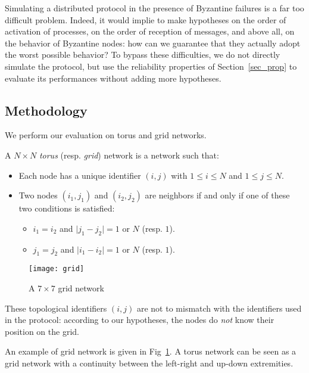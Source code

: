 \documentclass[a4paper,11pt]{article}
\begin{document}
Simulating a distributed protocol in the presence of Byzantine failures is a far too difficult problem. Indeed, it would implie to make hypotheses on the order of activation of processes, on the order of reception of messages, and above all, on the behavior of Byzantine nodes: how can we guarantee that they actually adopt the worst possible behavior? To bypass these difficulties, we do not directly simulate the protocol, but use the reliability properties of Section~\ref{sec_prop} to evaluate its performances without adding more hypotheses.

\subsection{Methodology}

We perform our evaluation on torus and grid networks.

\begin{definition}
A $N \times N$ \emph{torus} (resp. \emph{grid}) network is a network such that:
\begin{itemize}
\item Each node has a unique identifier $(i,j)$ with
$1 \leq i \leq N$ and $1 \leq j \leq N$.
\item Two nodes $(i_{1},j_{1})$ and $(i_{2},j_{2})$ are neighbors if and only if one of these two conditions is satisfied:
\begin{itemize}
\item $i_{1} = i_{2}$ and $ \lvert j_{1}-j_{2} \rvert  = 1$ or $N$ (resp. $1$).
\item $j_{1} = j_{2}$ and $ \lvert i_{1}-i_{2} \rvert = 1$ or $N$ (resp. $1$).
\end{itemize}
\end{itemize}
\end{definition}


\begin{figure}
\begin{center}
\texttt{[image: grid]}
\caption{A $7 \times 7$ grid network} 
\label{fig:grid}
\end{center}
\end{figure}

These topological identifiers $(i,j)$ are not to mismatch with the identifiers used in the protocol: according to our hypotheses, the nodes do \emph{not} know their position on the grid.

An example of grid network is given in Fig~\ref{fig:grid}.
A torus network can be seen as a grid network with a continuity between the left-right and up-down extremities.
\end{document}

